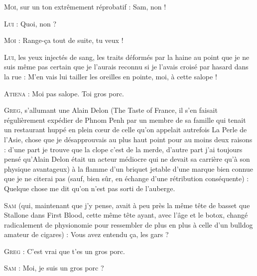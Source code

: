 \begin{dialogue}

\textsc{Moi}, sur un ton extrêmement réprobatif : Sam, non !

\textsc{Lui} : Quoi, non ?

\textsc{Moi} : Range-ça tout de suite, tu veux !

\textsc{Lui}, les yeux injectés de sang, les traits déformés par la haine au point que je ne suis même pas certain que je l’aurais reconnu si je l’avais croisé par hasard dans la rue : M’en vais lui tailler les oreilles en pointe, moi, à cette salope !

\textsc{Atiena} : Moi pas salope. Toi gros porc.

%
%
\textsc{Greg}, s’allumant une Alain Delon (The Taste of France, il s’en faisait régulièrement expédier de Phnom Penh par un membre de sa famille qui tenait un restaurant huppé en plein cœur de celle qu’on appelait autrefois La Perle de l’Asie, chose que je désapprouvais au plus haut point pour au moins deux raisons : d’une part je trouve que la clope c’est de la merde, d’autre part j’ai toujours pensé qu’Alain Delon était un acteur médiocre qui ne devait sa carrière qu’à son physique avantageux) à la flamme d’un briquet jetable d’une marque bien connue que je ne citerai pas (sauf, bien sûr, en échange d’une rétribution conséquente) : Quelque chose me dit qu’on n’est pas sorti de l’auberge.

\textsc{Sam} (qui, maintenant que j’y pense, avait à peu près la même tête de basset que Stallone dans First Blood, cette même tête ayant, avec l’âge et le botox, changé radicalement de physionomie pour ressembler de plus en plus à celle d’un bulldog amateur de cigares) : Vous avez entendu ça, les gars ?

\textsc{Greg} : C’est vrai que t’es un gros porc.

\textsc{Sam} : Moi, je suis un gros porc ?


\end{dialogue}

